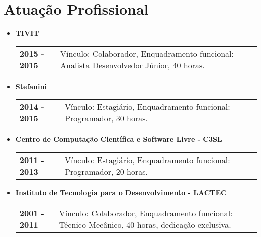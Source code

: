 \documentclass[pdftex, a4paper, 11pt]{article}
\begin{document}
\section*{Atuação Profissional}
\begin{itemize}
\item \textbf{TIVIT}\\
  \begin{tabular}{lp{13cm}}
    \textbf{2015 - 2015} & Vínculo: Colaborador, Enquadramento funcional: Analista Desenvolvedor Júnior, 40 horas.\\
  \end{tabular}

\item \textbf{Stefanini}\\
  \begin{tabular}{lp{13cm}}
    \textbf{2014 - 2015} & Vínculo: Estagiário, Enquadramento funcional: Programador, 30 horas.\\
  \end{tabular}

\item \textbf{Centro de Computação Científica e Software Livre - C3SL}\\
  \begin{tabular}{lp{13cm}}
    \textbf{2011 - 2013} & Vínculo: Estagiário, Enquadramento funcional: Programador, 20 horas.\\
  \end{tabular}
  
\item \textbf{Instituto de Tecnologia para o Desenvolvimento - LACTEC}\\
  \begin{tabular}{lp{13cm}}
    \textbf{2001 - 2011} & Vínculo: Colaborador, Enquadramento funcional: Técnico Mecânico, 40 horas, dedicação exclusiva.\\
  \end{tabular}
\end{itemize}

\end{document}

